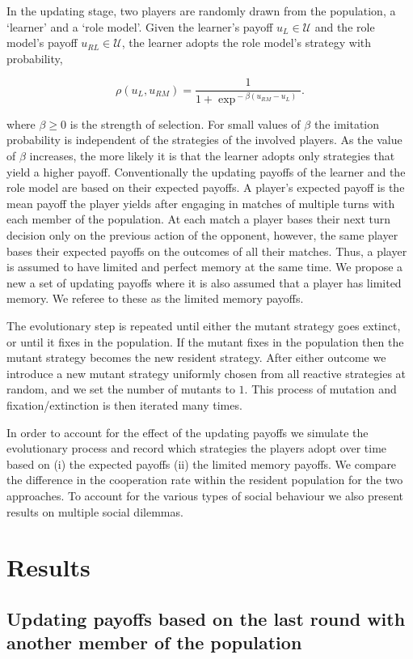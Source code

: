 \documentclass[11pt]{article}
\theoremstyle{plainCl1}
\theoremstyle{plainCl2}
\begin{document}
In the updating stage, two players are randomly drawn from the population, a
`learner' and a `role model'. Given the learner's payoff $u_L\!\in\!
\mathcal{U}$ and the role model's payoff $u_{RL}\!\in\! \mathcal{U}$, the
learner adopts the role model's strategy with probability,

\begin{equation} \label{Eq:rho}
  \rho(u_{L}, u_{RM}) = \frac{1}{1\!+\! \exp^{\!-\!\beta (u_{RM}\!-\!u_{L})}}.
\end{equation}

where $\beta\!\ge\!0$ is the strength of selection. For small values of $\beta$
the imitation probability is independent of the strategies of the involved
players. As the value of $\beta$ increases, the more likely it is that the
learner adopts only strategies that yield a higher payoff. Conventionally the
updating payoffs of the learner and the role model are based on their expected
payoffs. A player's expected payoff is the mean payoff the player yields after
engaging in matches of multiple turns with each member of the population. At
each match a player bases their next turn decision only on the previous action
of the opponent, however, the same player bases their expected payoffs on the
outcomes of all their matches. Thus, a player is assumed to have limited and
perfect memory at the same time. We propose a new a set of updating payoffs
where it is also assumed that a player has limited memory. We referee to these
as the limited memory payoffs.

The evolutionary step is repeated until either the mutant strategy goes extinct,
or until it fixes in the population. If the mutant fixes in the population then
the mutant strategy becomes the new resident strategy. After either outcome we
introduce a new mutant strategy uniformly chosen from all reactive strategies at
random, and we set the number of mutants to $1$. This process of mutation and
fixation/extinction is then iterated many times.

In order to account for the effect of the updating payoffs we simulate the
evolutionary process and record which strategies the players adopt over time
based on (i) the expected payoffs (ii) the limited memory payoffs. We compare
the difference in the cooperation rate within the resident population for the
two approaches. To account for the various types of social behaviour we also
present results on multiple social dilemmas.


\section{Results}\label{section:results} \subsection{Updating payoffs based on
the last round with another member of the population}\label{section:donation}
\end{document}
